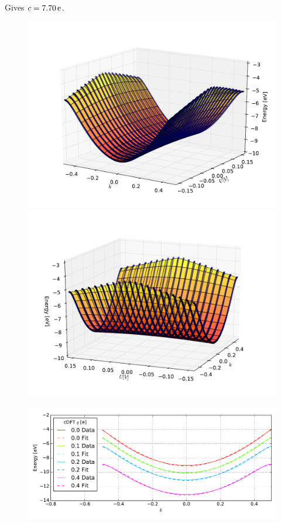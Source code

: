 Gives $c = \unit[7.70]{e}$.
\begin{figure}
	\centering
	\includegraphics[width = 13cm]{Images/polyacetylene/charging/3D/figure_1-1}
	\includegraphics[width = 13cm]{Images/polyacetylene/charging/3D/figure_1-2}
	\caption{}
	\label{}
\end{figure}
\begin{figure}
	\centering
	\includegraphics[width = 13cm]{Images/polyacetylene/charging/3D_cuts}
	\caption{}
	\label{}
\end{figure}
